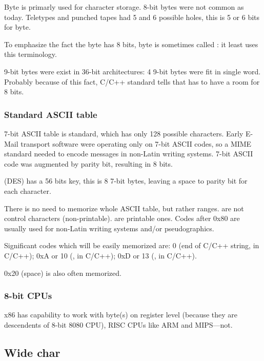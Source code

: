 Byte is primarly used for character storage.
8-bit bytes were not common as today.
Teletypes and punched tapes had 5 and 6 possible holes, this is 5 or 6 bits for byte.

To emphasize the fact the byte has 8 bits, byte is sometimes called :
it least  uses this terminology.

9-bit bytes were exist in 36-bit architectures: 4 9-bit bytes were fit in single word.
Probably because of this fact, C/C++ standard tells that  has to have a room for  8 bits.

\subsubsection{Standard ASCII table}

7-bit ASCII table is standard, which has only 128 possible characters.
Early E-Mail transport software were operating only on 7-bit ASCII codes, so a \ac{MIME} standard needed to encode messages
in non-Latin writing systems.
7-bit ASCII code was augmented by parity bit, resulting in 8 bits.

 (\ac{DES}) has a 56 bits key, this is 8 7-bit bytes,
leaving a space to parity bit for each character.

There is no need to memorize whole \ac{ASCII} table, but rather ranges.
 are not control characters (non-printable).
 are printable ones.
Codes after 0x80 are usually used for non-Latin writing systems and/or pseudographics.

Significant codes which will be easily memorized are:
0 (end of C/C++ string,  in C/C++);
0xA or 10 (,  in C/C++);
0xD or 13 (,  in C/C++).

0x20 (space) is also often memorized.

\subsubsection{8-bit CPUs}

x86 has capability to work with byte(s) on register level (because they are descendents of 8-bit 8080 CPU),
RISC CPUs like ARM and MIPS---not.

\subsection{Wide char}

